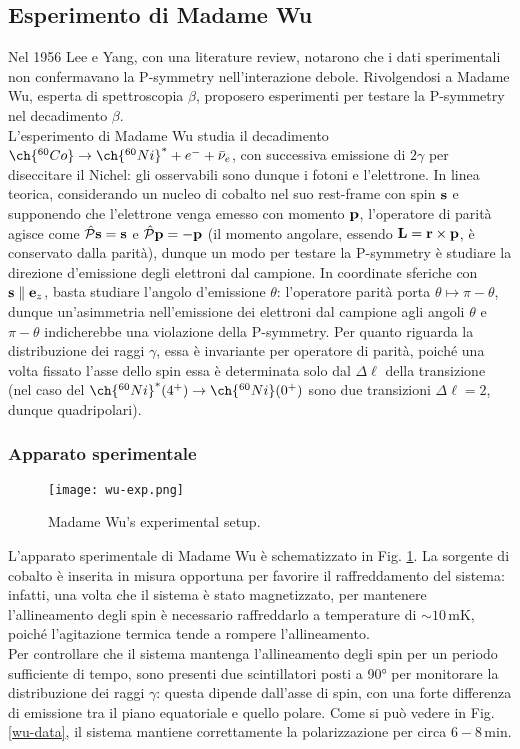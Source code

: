 \subsection{Esperimento di Madame Wu}

Nel 1956 Lee e Yang, con una literature review, notarono che i dati sperimentali non confermavano la P-symmetry nell'interazione debole. Rivolgendosi a Madame Wu, esperta di spettroscopia $ \beta $, proposero esperimenti per testare la P-symmetry nel decadimento $ \beta $.\\
L'esperimento di Madame Wu studia il decadimento $ \ch{^{60}Co} \rightarrow \ch{^{60}Ni}^* + e^- + \bar{\nu}_e $, con successiva emissione di $ 2\gamma $ per diseccitare il Nichel: gli osservabili sono dunque i fotoni e l'elettrone. In linea teorica, considerando un nucleo di cobalto nel suo rest-frame con spin $ \mathbf{s} $ e supponendo che l'elettrone venga emesso con momento $ \mathbf{p} $, l'operatore di parità agisce come $ \hat{\mathcal{P}} \mathbf{s} = \mathbf{s} $ e $ \hat{\mathcal{P}} \mathbf{p} = - \mathbf{p} $ (il momento angolare, essendo $ \mathbf{L} = \mathbf{r} \times \mathbf{p} $, è conservato dalla parità), dunque un modo per testare la P-symmetry è studiare la direzione d'emissione degli elettroni dal campione. In coordinate sferiche con $ \mathbf{s} \parallel \mathbf{e}_z $, basta studiare l'angolo d'emissione $ \theta $: l'operatore parità porta $ \theta \mapsto \pi - \theta $, dunque un'asimmetria nell'emissione dei elettroni dal campione agli angoli $ \theta $ e $ \pi - \theta $ indicherebbe una violazione della P-symmetry. Per quanto riguarda la distribuzione dei raggi $ \gamma $, essa è invariante per operatore di parità, poiché una volta fissato l'asse dello spin essa è determinata solo dal $ \Delta \ell $ della transizione (nel caso del $ \ch{^{60}Ni}^*(4^+) \rightarrow \ch{^{60}Ni}(0^+) $ sono due transizioni $ \Delta \ell = 2 $, dunque quadripolari).

\subsubsection{Apparato sperimentale}

\begin{figure}
	\centering
	\texttt{[image: wu-exp.png]}
	\caption{Madame Wu's experimental setup.}
	\label{wu-exp}
\end{figure}

L'apparato sperimentale di Madame Wu è schematizzato in Fig. \ref{wu-exp}. La sorgente di cobalto è inserita in misura opportuna per favorire il raffreddamento del sistema: infatti, una volta che il sistema è stato magnetizzato, per mantenere l'allineamento degli spin è necessario raffreddarlo a temperature di $ \sim 10\,\text{mK} $, poiché l'agitazione termica tende a rompere l'allineamento.\\
Per controllare che il sistema mantenga l'allineamento degli spin per un periodo sufficiente di tempo, sono presenti due scintillatori posti a 90° per monitorare la distribuzione dei raggi $ \gamma $: questa dipende dall'asse di spin, con una forte differenza di emissione tra il piano equatoriale e quello polare. Come si può vedere in Fig. \ref{wu-data}, il sistema mantiene correttamente la polarizzazione per circa $ 6 - 8\,\text{min} $.

